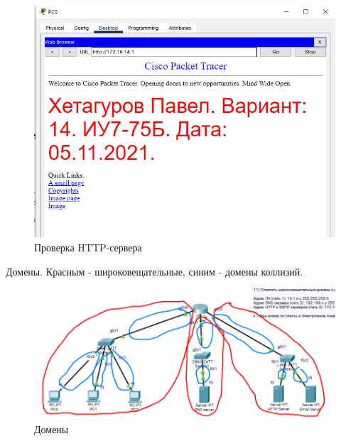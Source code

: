 \documentclass[12pt, a4paper]{extarticle}
\begin{document}
\begin{figure}[H]
	\centering
	\includegraphics[scale=0.7]{images/http-check.png}
	\caption{Проверка HTTP-сервера}
\end{figure}

Домены. Красным - широковещательные, синим - домены коллизий.
\begin{figure}[H]
	\centering
	\includegraphics[scale=0.7]{images/domens.png}
	\caption{Домены}
\end{figure}
\end{document}
